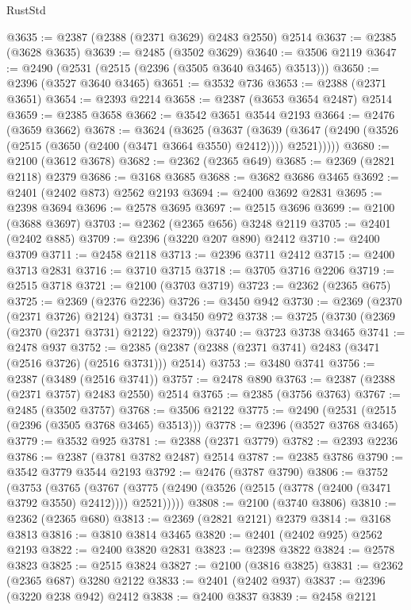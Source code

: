 \begin{lexlean}{RustStd}
\begin{coremodule}
@3635 := @2387 (@2388 (@2371 @3629) @2483 @2550) @2514
@3637 := @2385 (@3628 @3635)
@3639 := @2485 (@3502 @3629)
@3640 := @3506 @2119
@3647 := @2490 (@2531 (@2515 (@2396 (@3505 @3640 @3465) @3513)))
@3650 := @2396 (@3527 @3640 @3465)
@3651 := @3532 @736
@3653 := @2388 (@2371 @3651)
@3654 := @2393 @2214
@3658 := @2387 (@3653 @3654 @2487) @2514
@3659 := @2385 @3658
@3662 := @3542 @3651 @3544 @2193
@3664 := @2476 (@3659 @3662)
@3678 := @3624
    (@3625
      (@3637
        (@3639 (@3647 (@2490 (@3526 (@2515 (@3650 (@2400 (@3471 @3664 @3550) @2412)))) @2521)))))
@3680 := @2100 (@3612 @3678)
@3682 := @2362 (@2365 @649)
@3685 := @2369 (@2821 @2118) @2379
@3686 := @3168 @3685
@3688 := @3682 @3686 @3465
@3692 := @2401 (@2402 @873) @2562 @2193
@3694 := @2400 @3692 @2831
@3695 := @2398 @3694
@3696 := @2578 @3695
@3697 := @2515 @3696
@3699 := @2100 (@3688 @3697)
@3703 := @2362 (@2365 @656) @3248 @2119
@3705 := @2401 (@2402 @885)
@3709 := @2396 (@3220 @207 @890) @2412
@3710 := @2400 @3709
@3711 := @2458 @2118
@3713 := @2396 @3711 @2412
@3715 := @2400 @3713 @2831
@3716 := @3710 @3715
@3718 := @3705 @3716 @2206
@3719 := @2515 @3718
@3721 := @2100 (@3703 @3719)
@3723 := @2362 (@2365 @675)
@3725 := @2369 (@2376 @2236)
@3726 := @3450 @942
@3730 := @2369 (@2370 (@2371 @3726) @2124)
@3731 := @3450 @972
@3738 := @3725 (@3730 (@2369 (@2370 (@2371 @3731) @2122) @2379))
@3740 := @3723 @3738 @3465
@3741 := @2478 @937
@3752 := @2385 (@2387 (@2388 (@2371 @3741) @2483 (@3471 (@2516 @3726) (@2516 @3731))) @2514)
@3753 := @3480 @3741
@3756 := @2387 (@3489 (@2516 @3741))
@3757 := @2478 @890
@3763 := @2387 (@2388 (@2371 @3757) @2483 @2550) @2514
@3765 := @2385 (@3756 @3763)
@3767 := @2485 (@3502 @3757)
@3768 := @3506 @2122
@3775 := @2490 (@2531 (@2515 (@2396 (@3505 @3768 @3465) @3513)))
@3778 := @2396 (@3527 @3768 @3465)
@3779 := @3532 @925
@3781 := @2388 (@2371 @3779)
@3782 := @2393 @2236
@3786 := @2387 (@3781 @3782 @2487) @2514
@3787 := @2385 @3786
@3790 := @3542 @3779 @3544 @2193
@3792 := @2476 (@3787 @3790)
@3806 := @3752
    (@3753
      (@3765
        (@3767 (@3775 (@2490 (@3526 (@2515 (@3778 (@2400 (@3471 @3792 @3550) @2412)))) @2521)))))
@3808 := @2100 (@3740 @3806)
@3810 := @2362 (@2365 @680)
@3813 := @2369 (@2821 @2121) @2379
@3814 := @3168 @3813
@3816 := @3810 @3814 @3465
@3820 := @2401 (@2402 @925) @2562 @2193
@3822 := @2400 @3820 @2831
@3823 := @2398 @3822
@3824 := @2578 @3823
@3825 := @2515 @3824
@3827 := @2100 (@3816 @3825)
@3831 := @2362 (@2365 @687) @3280 @2122
@3833 := @2401 (@2402 @937)
@3837 := @2396 (@3220 @238 @942) @2412
@3838 := @2400 @3837
@3839 := @2458 @2121

\end{coremodule}
\end{lexlean}
